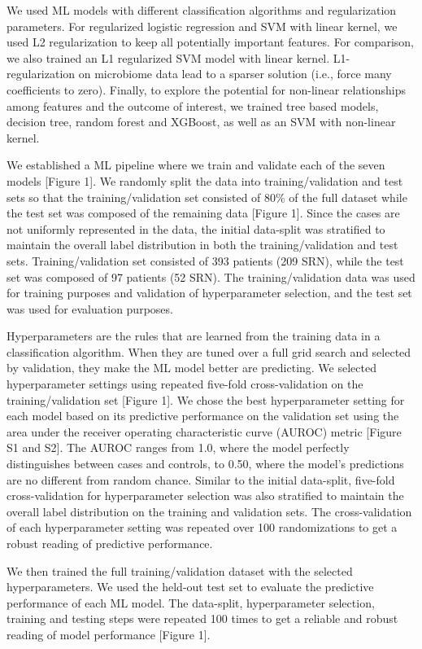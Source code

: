 \documentclass[11pt,]{article}
\begin{document}
We used ML models with different classification algorithms and
regularization parameters. For regularized logistic regression and SVM
with linear kernel, we used L2 regularization to keep all potentially
important features. For comparison, we also trained an L1 regularized
SVM model with linear kernel. L1-regularization on microbiome data lead
to a sparser solution (i.e., force many coefficients to zero). Finally,
to explore the potential for non-linear relationships among features and
the outcome of interest, we trained tree based models, decision tree,
random forest and XGBoost, as well as an SVM with non-linear kernel.

We established a ML pipeline where we train and validate each of the
seven models {[}Figure 1{]}. We randomly split the data into
training/validation and test sets so that the training/validation set
consisted of 80\% of the full dataset while the test set was composed of
the remaining data {[}Figure 1{]}. Since the cases are not uniformly
represented in the data, the initial data-split was stratified to
maintain the overall label distribution in both the training/validation
and test sets. Training/validation set consisted of 393 patients (209
SRN), while the test set was composed of 97 patients (52 SRN). The
training/validation data was used for training purposes and validation
of hyperparameter selection, and the test set was used for evaluation
purposes.

Hyperparameters are the rules that are learned from the training data in
a classification algorithm. When they are tuned over a full grid search
and selected by validation, they make the ML model better are
predicting. We selected hyperparameter settings using repeated five-fold
cross-validation on the training/validation set {[}Figure 1{]}. We chose
the best hyperparameter setting for each model based on its predictive
performance on the validation set using the area under the receiver
operating characteristic curve (AUROC) metric {[}Figure S1 and S2{]}.
The AUROC ranges from 1.0, where the model perfectly distinguishes
between cases and controls, to 0.50, where the model's predictions are
no different from random chance. Similar to the initial data-split,
five-fold cross-validation for hyperparameter selection was also
stratified to maintain the overall label distribution on the training
and validation sets. The cross-validation of each hyperparameter setting
was repeated over 100 randomizations to get a robust reading of
predictive performance.

We then trained the full training/validation dataset with the selected
hyperparameters. We used the held-out test set to evaluate the
predictive performance of each ML model. The data-split, hyperparameter
selection, training and testing steps were repeated 100 times to get a
reliable and robust reading of model performance {[}Figure 1{]}.
\end{document}
